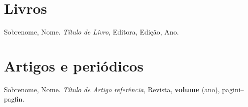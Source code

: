 \documentclass[11pt,a4paper]{book}
\begin{document}


\tableofcontents

\endgroup


\mainmatter

\acertacabecalhos{}


\appendix



\backmatter

\begin{thebibliography}{99}
  \section*{Livros}
     Sobrenome, Nome. \emph{Título de Livro}, Editora, Edição, Ano.
  \section*{Artigos e periódicos}
     Sobrenome, Nome.  \emph{Título de Artigo referência},
    Revista, {\bf volume} (ano), pagini--pagfin.
\end{thebibliography}



\printindex   %
\end{document}
